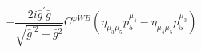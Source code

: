 %
\begin{dmath*}
%
  -  \frac{2 i {\bar g}^\prime {\bar g}{}}{\sqrt{{\bar g}^{\prime 2} + {\bar g}{}^2}}C^{ \varphi  WB} \left(\eta_{\mu_3 \mu_5} p_5^{\mu_4} - \eta_{\mu_4 \mu_5} p_5^{\mu_3}\right)
%
\end{dmath*}
%
